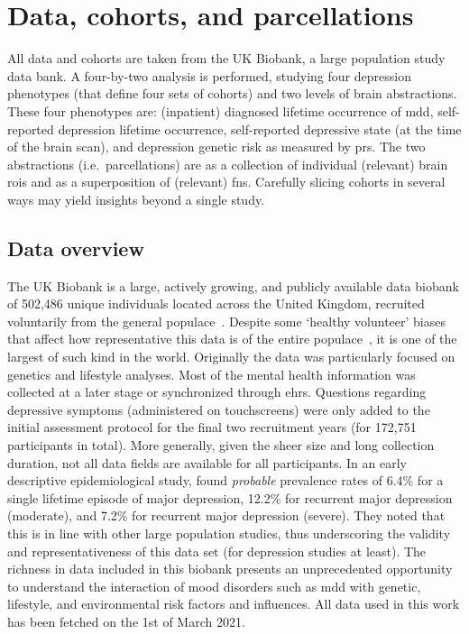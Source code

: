 \clearpage
\section{Data, cohorts, and parcellations}\label{sec:ukb-data}

All data and cohorts are taken from the UK Biobank, a large population study data bank.
A four-by-two analysis is performed, studying four depression phenotypes (that define four sets of cohorts) and two levels of brain abstractions.
These four phenotypes are: (inpatient) diagnosed lifetime occurrence of \gls{mdd}, self-reported depression lifetime occurrence, self-reported depressive state (at the time of the brain scan), and depression genetic risk as measured by \gls{prs}.
The two abstractions (i.e.~parcellations) are as a collection of individual (relevant) brain \glspl{roi} and as a superposition of (relevant) \glspl{fn}.
Carefully slicing cohorts in several ways may yield insights beyond a single study.

\subsection{Data overview}

The UK Biobank is a large, actively growing, and publicly available data biobank of 502,486 unique individuals located across the United Kingdom, recruited voluntarily from the general populace~\parencite{Collins2012, Allen2014b}.
Despite some `healthy volunteer' biases that affect how representative this data is of the entire populace~\parencite[see][]{Fry2017}, it is one of the largest of such kind in the world.
%
Originally the data was particularly focused on genetics and lifestyle analyses.
Most of the mental health information was collected at a later stage or synchronized through \glspl{ehr}.
Questions regarding depressive symptoms (administered on touchscreens) were only added to the initial assessment protocol for the final two recruitment years (for 172,751 participants in total).
More generally, given the sheer size and long collection duration, not all data fields are available for all participants.
%
In an early descriptive epidemiological study, \textcite{Smith2013c} found \emph{probable} prevalence rates of 6.4\% for a single lifetime episode of major depression, 12.2\% for recurrent major depression (moderate), and 7.2\% for recurrent major depression (severe).
They noted that this is in line with other large population studies, thus underscoring the validity and representativeness of this data set (for depression studies at least).
The richness in data included in this biobank presents an unprecedented opportunity to understand the interaction of mood disorders such as \gls{mdd} with genetic, lifestyle, and environmental risk factors and influences.
All data used in this work has been fetched on the 1st of March 2021.

